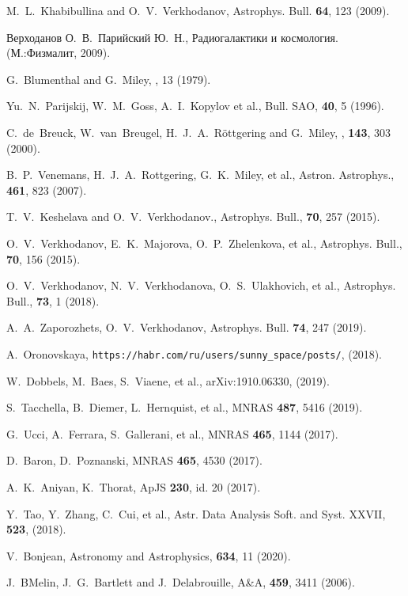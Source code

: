 \documentclass[
aps,%
12pt,%
final,%
notitlepage,%
oneside,%
onecolumn,%
nobibnotes,%
nofootinbib,%
superscriptaddress,%
noshowpacs,%
centertags]%
{revtex4}
\begin{document}
\begin{thebibliography}{99}
M.~L.~Khabibullina and O.~V.~Verkhodanov, Astrophys. Bull. {\bf 64}, 123 (2009).

Верходанов О.~В.~Парийский Ю.~Н., Радиогалактики и космология. (М.:Физмалит, 2009).

 G.~Blumenthal and G.~Miley, , 13 (1979).

 Yu.~N.~Parijskij,  W.~M.~Goss,  A.~I.~Kopylov et al., Bull. SAO, {\bf 40}, 5 (1996).

 C.~de~Breuck,   W.~van~Breugel,  H.~J.~A.~R\"ottgering and G.~Miley, \aas, {\bf 143}, 303 (2000).

B.~P.~Venemans, H.~J.~A.~Rottgering, G.~K.~Miley,  et al., Astron. Astrophys.,  {\bf 461}, 823 (2007).

T.~V.~Keshelava and O.~V.~Verkhodanov., Astrophys. Bull., {\bf 70}, 257 (2015).


O.~V.~Verkhodanov, E.~K.~Majorova, O.~P.~Zhelenkova, et al., Astrophys. Bull., {\bf 70}, 156 (2015).

O.~V.~Verkhodanov, N.~V.~Verkhodanova, O.~S.~Ulakhovich, et al., Astrophys. Bull., {\bf 73}, 1 (2018).

A.~A.~Zaporozhets, O.~V.~Verkhodanov, Astrophys. Bull. {\bf 74}, 247 (2019).

A.~Oronovskaya, {\tt https://habr.com/ru/users/sunny\_space/posts/}, (2018).

W.~Dobbels, M.~Baes, S.~Viaene, et al., arXiv:1910.06330, (2019).

S.~Tacchella, B.~Diemer, L.~Hernquist, et al., MNRAS {\bf 487}, 5416 (2019).

G.~Ucci, A.~Ferrara, S.~Gallerani, et al., MNRAS {\bf 465}, 1144 (2017).

D.~Baron, D.~Poznanski, MNRAS {\bf 465}, 4530 (2017).

A.~K.~Aniyan, K.~Thorat, ApJS {\bf 230}, id. 20 (2017).

Y.~Tao, Y.~Zhang, C.~Cui, et al., Astr. Data Analysis Soft. and Syst. XXVII, {\bf 523}, (2018).

V.~Bonjean, Astronomy and Astrophysics, {\bf 634}, 11 (2020).


J.~BMelin, J.~G.~Bartlett and J.~Delabrouille, A\&A, {\bf 459}, 3411 (2006).


\end{thebibliography}
\end{document}
